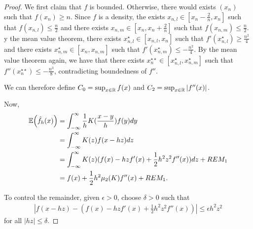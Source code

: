 \begin{proof}
  We first claim that $f$ is bounded. Otherwise, there would exists
  $(x_{n})$ such that $f(x_{n}) \geq n$. Since $f$ is a density, the
  exists $x_{n, l} \in [x_{n} - \frac{2}{n}, x_{n}]$ such that
  $f(x_{n, l}) \leq \frac{n}{2}$ and there exists $x_{n, m} \in
  [x_{n}, x_{n} + \frac{2}{n}]$ such that $f(x_{n, m}) \leq
  \frac{n}{2}$. y the mean value theorem, there exists $x^{\star}_{n,
    l} \in [x_{n, l}, x_{n}]$ such that $f'(x^{\star}_{n, l}) \geq
  \frac{n^{2}}{4}$ and there exists $x^{\star}_{n, m} \in [x_{n},
  x_{n, m}]$ such that $f'(x^{\star}_{n, m}) \leq -\frac{n^{2}}{4}$.
  By the mean value theorem again, we have that there exists
  $x_{n}^{\star \star} \in [x_{n, l}^{\star}, x_{n, m}^{\star}]$ such
  that $f''(x_{n}^{\star \star}) \leq -\frac{n^{3}}{8}$, contradicting
  boundedness of $f''$.

  We can therefore define $C_{0} = \sup_{x \in \mathbb{R}} f(x)$ and $C_{2} =
  \sup_{x \in \mathbb{R}} |f''(x)|$.

  Now,
  \begin{align}
    \label{eq:16}
    \E{\hat f_{h}(x)} &= \int_{-\infty}^{\infty} \frac{1}{h}
    K(\frac{x-y}{h}) f(y) dy \\
    &= \int_{-\infty}^{\infty}  K(z) f(x - hz) dz \\
    &= \int_{-\infty}^{\infty} K(z)(f(x) - hz f'(x) + \frac{1}{2} h^{2}
    z^{2} f''(x)) dz + REM_{1} \\
    &= f(x) + \frac{1}{2} h^{2} \mu_{2}(K) f''(x) + REM_{1}.
  \end{align}

  To control the remainder, given $\epsilon > 0$, choose $\delta > 0$
  such that
  \begin{align}
    \label{eq:17}
    |f(x - hz) - (f(x) - hz f'(x) + \frac{1}{2} h^{2} z^{2} f''(x))|
    \leq \epsilon h^{2} z^{2}
  \end{align} for all $|hz| \leq \delta$.


\end{proof}
